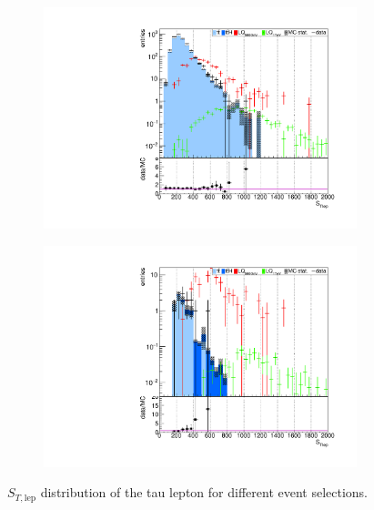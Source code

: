 \begin{figure}
\begin{subfigure}[t]{0.49\textwidth}
                \label{STlep:2b2tau}
                \end{subfigure}
                \begin{subfigure}[t]{0.49\textwidth}
                \includegraphics[width=\textwidth]{figures/plots/kinLQ75/STlep_2j1b_1tau.pdf}
                \label{STlep:1b1tau}
                \end{subfigure}
                \begin{subfigure}[t]{0.49\textwidth}
                \includegraphics[width=\textwidth]{figures/plots/kinLQ75/STlep_2j1b_2tau.pdf}
                \label{STlep:1b2tau}
                \end{subfigure}
\caption[$S_{T,\text{lep}}$ distribution of the tau lepton for different event selections.]{$S_{T,\text{lep}}$ distribution of the tau lepton for different event selections.}
\label{STlep}
\end{figure}
